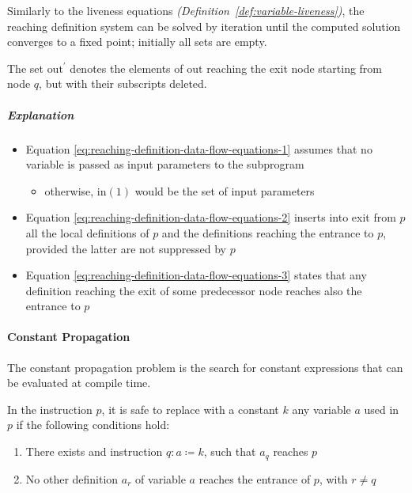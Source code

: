 \documentclass[english]{article}
\begin{document}
Similarly to the liveness equations \textit{(Definition~\ref{def:variable-liveness})}, the reaching definition system can be solved by iteration until the computed solution converges to a fixed point;
initially all sets are empty.

\bigskip
The set \(\text{out}^\prime\) denotes the elements of \(\text{out}\) reaching the exit node starting from node \(q\), but with their subscripts deleted.

\subparagraph*{Explanation}

\begin{itemize}
  \item Equation \ref{eq:reaching-definition-data-flow-equations-1} assumes that no variable is passed as input parameters to the subprogram
        \begin{itemize}[label=\(\rightarrow\)]
          \item otherwise, \(\text{in}(1)\) would be the set of input parameters
        \end{itemize}
  \item Equation \ref{eq:reaching-definition-data-flow-equations-2} inserts into exit from \(p\) all the local definitions of \(p\) and the definitions reaching the entrance to \(p\), provided the latter are not suppressed by \(p\)
  \item Equation \ref{eq:reaching-definition-data-flow-equations-3} states that any definition reaching the exit of some predecessor node reaches also the entrance to \(p\)
\end{itemize}

\paragraph{Constant Propagation}
\label{par:constant-propagation}

The constant propagation problem is the search for constant expressions that can be evaluated at compile time.

\begin{definition}
  \label{def:constant-propagation}
  In the instruction \(p\), it is safe to replace with a constant \(k\) any variable \(a\) used in \(p\) if the following conditions hold:

  \begin{enumerate}
    \item There exists and instruction \(q : a \coloneqq k\), such that \(a_q\) reaches \(p\)
    \item No other definition \(a_r\) of variable \(a\) reaches the entrance of \(p\), with \(r \neq q\)
  \end{enumerate}
\end{definition}
\end{document}
